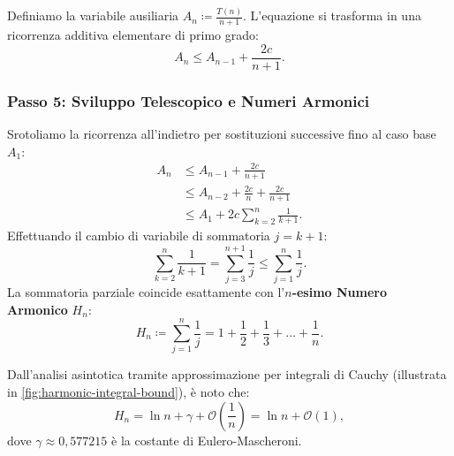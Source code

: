 Definiamo la variabile ausiliaria $A_n \coloneqq \frac{T(n)}{n + 1}$. L'equazione si trasforma in una ricorrenza additiva elementare di primo grado:
\begin{equation}
  A_n \le A_{n - 1} + \frac{2c}{n + 1}.
\end{equation}

\subsubsection{Passo 5: Sviluppo Telescopico e Numeri Armonici}
Srotoliamo la ricorrenza all'indietro per sostituzioni successive fino al caso base $A_1$:
\begin{align}
  A_n &\le A_{n-1} + \frac{2c}{n+1} \\
      &\le A_{n-2} + \frac{2c}{n} + \frac{2c}{n+1} \\
      &\le A_1 + 2c \sum_{k=2}^n \frac{1}{k+1}.
\end{align}
Effettuando il cambio di variabile di sommatoria $j = k + 1$:
\begin{equation}
  \sum_{k=2}^n \frac{1}{k+1} = \sum_{j=3}^{n+1} \frac{1}{j} \le \sum_{j=1}^n \frac{1}{j}.
\end{equation}
La sommatoria parziale coincide esattamente con l'\textbf{$n$-esimo Numero Armonico} $H_n$:
\begin{equation}
  H_n \coloneqq \sum_{j=1}^n \frac{1}{j} = 1 + \frac{1}{2} + \frac{1}{3} + \dots + \frac{1}{n}.
\end{equation}

Dall'analisi asintotica tramite approssimazione per integrali di Cauchy (illustrata in \autoref{fig:harmonic-integral-bound}), è noto che:
\begin{equation}
  H_n = \ln n + \gamma + \mathcal{O}\left(\frac{1}{n}\right) = \ln n + \mathcal{O}(1),
\end{equation}
dove $\gamma \approx 0{,}577215$ è la costante di Eulero-Mascheroni.

